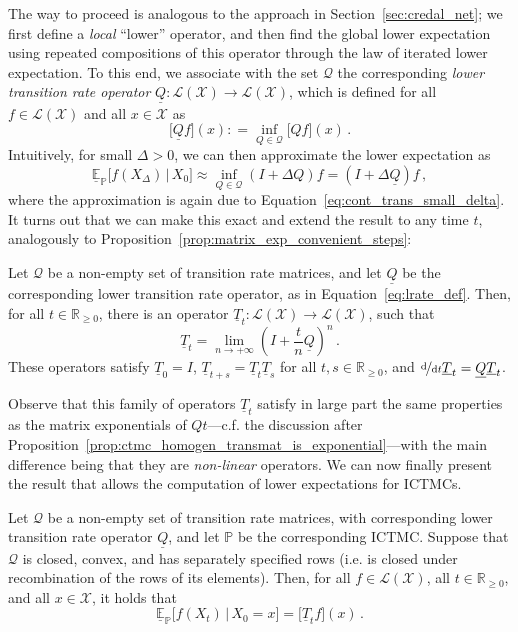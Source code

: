 \documentclass[graybox]{svmult}
\newcommand{\reals}{\mathbb{R}}
\newcommand{\realsnonneg}{\reals_{\geq 0}}
\newcommand{\states}{\mathcal{X}}
\newcommand{\gambles}{\mathcal{L}}
\newcommand{\gamblesX}{\gambles(\states)}
\newcommand{\coloneqq}{:\!=}
\begin{document}
The way to proceed is analogous to the approach in Section~\ref{sec:credal_net}; we first define a \emph{local} ``lower'' operator, and then find the global lower expectation using repeated compositions of this operator through the law of iterated lower expectation. To this end, we associate with the set $\mathcal{Q}$ the corresponding \emph{lower transition rate operator} $\underline{Q}:\gamblesX\to\gamblesX$, which is defined for all $f\in\gamblesX$ and all $x\in\states$ as
\begin{equation}\label{eq:lrate_def}
\bigl[\underline{Q}f\bigr](x) \coloneqq \inf_{Q\in\mathcal{Q}} \bigl[Qf\bigr](x)\,.
\end{equation}
Intuitively, for small $\Delta>0$, we can then approximate the lower expectation as
\begin{equation*}
\underline{\mathbb{E}}_\mathbb{P}\bigl[f(X_\Delta)\,\vert\,X_0\bigr] \approx \inf_{Q\in\mathcal{Q}} (I+\Delta Q)f = (I+\Delta\underline{Q})f\,,
\end{equation*}
where the approximation is again due to Equation~\eqref{eq:cont_trans_small_delta}. It turns out that we can make this exact and extend the result to any time $t$, analogously to Proposition~\ref{prop:matrix_exp_convenient_steps}:
\begin{theorem}\label{theo:continuous_trans_is_imprecise_exponential}
Let $\mathcal{Q}$ be a non-empty set of transition rate matrices, and let $\underline{Q}$ be the corresponding lower transition rate operator, as in Equation~\eqref{eq:lrate_def}. Then, for all $t\in\realsnonneg$, there is an operator $\underline{T}_t:\gamblesX\to\gamblesX$, such that
\begin{equation*}
\underline{T}_t = \lim_{n\to+\infty}\left(I+\frac{t}{n}\underline{Q}\right)^n\,.
\end{equation*}
These operators satisfy $\underline{T}_0=I$, $\underline{T}_{t+s}=\underline{T}_t\underline{T}_s$ for all $t,s\in\realsnonneg$, and $\nicefrac{\mathrm{d}}{\mathrm{d}t}\underline{T}_t=\underline{Q}\underline{T}_t$. 
\end{theorem}
Observe that this family of operators $\underline{T}_t$ satisfy in large part the same properties as the matrix exponentials of $Qt$---c.f. the discussion after Proposition~\ref{prop:ctmc_homogen_transmat_is_exponential}---with the main difference being that they are \emph{non-linear} operators. We can now finally present the result that allows the computation of lower expectations for ICTMCs.
\begin{theorem}\label{theo:lower_exp_is_lower_trans_ctmc}
Let $\mathcal{Q}$ be a non-empty set of transition rate matrices, with corresponding lower transition rate operator $\underline{Q}$, and let $\mathbb{P}$ be the corresponding ICTMC. Suppose that $\mathcal{Q}$ is closed, convex, and has separately specified rows (i.e. is closed under recombination of the rows of its elements). Then, for all $f\in\gamblesX$, all $t\in\realsnonneg$, and all $x\in\states$, it holds that
\begin{equation}\label{eq:lower_exp_is_lower_trans_ctmc}
\underline{\mathbb{E}}_\mathbb{P}\bigl[f(X_t)\,\vert\,X_0=x\bigr] = \bigl[\underline{T}_tf\bigr](x)\,.
\end{equation}
\end{theorem}
\end{document}
